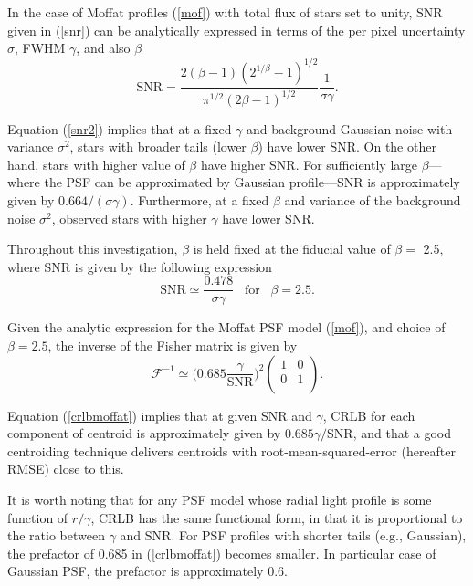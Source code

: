 \documentclass[12pt, preprint]{aastex}
\newcommand{\beq}{\begin{equation}}
\newcommand{\eeq}{\end{equation}}
\begin{document}
 In the case of Moffat profiles (\ref{mof}) with total flux of stars set to unity, 
SNR given in (\ref{snr}) can be analytically 
expressed in terms of the per pixel uncertainty
$\sigma$, FWHM $\gamma$, and also $\beta$
\beq
\text{SNR} = \frac{2(\beta-1)(2^{1/\beta}-1)^{1/2}}{\pi^{1/2}(2\beta-1)^{1/2}}\frac{1}{\sigma \gamma}.
\label{snr2}
\eeq

Equation (\ref{snr2}) implies that at a fixed $\gamma$ and background Gaussian noise 
with variance $\sigma^{2}$, stars with broader tails (lower $\beta$) have lower SNR.
On the other hand, stars with higher value of $\beta$ have higher SNR. 
For sufficiently large $\beta$---where the PSF can be
approximated by Gaussian profile---SNR is approximately given by $0.664/(\sigma\gamma)$.
Furthermore, at a fixed $\beta$ and variance of the background noise $\sigma^{2}$,
observed stars with higher $\gamma$ have lower SNR.  

Throughout this investigation, $\beta$ is held fixed at the fiducial value of $\beta=$ 2.5, where SNR
is given by the following expression
\beq
\text{SNR} \simeq \frac{0.478}{\sigma \gamma}\;\;\; \mathrm{for}\;\;\; \beta = 2.5.
\eeq

Given the analytic expression for the Moffat PSF model (\ref{mof}), and choice of $\beta=2.5$, 
the inverse of the Fisher matrix is given by
\beq
  \mathcal{F}^{-1} \simeq \Big(0.685 \frac{\gamma}{\text{SNR}}\Big)^{2} 
  \begin{pmatrix}
      1 & 0\\
      0 & 1\\
  \end{pmatrix}.
\label{crlbmoffat}
\eeq

Equation (\ref{crlbmoffat}) implies that at given SNR and $\gamma$,
CRLB for each component of centroid is approximately given by $0.685\gamma/\text{SNR}$,
and that a good centroiding technique delivers centroids with
root-mean-squared-error (hereafter RMSE) close to this. 

It is worth noting that for any PSF model whose radial light profile is some function of 
$r/\gamma$, CRLB has the same functional form, in that it is proportional to the ratio
between $\gamma$ and SNR. 
For PSF profiles with shorter tails (e.g., Gaussian), the prefactor of 0.685 in (\ref{crlbmoffat})
becomes smaller. In particular case of Gaussian PSF, the prefactor is approximately 0.6. 
\end{document}
